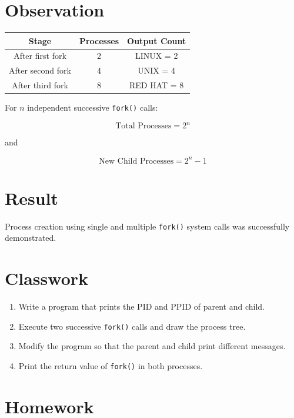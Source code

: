 \documentclass[12pt,a4paper]{report}
\begin{document}
\section*{Observation}

\begin{center}
\begin{tabular}{|c|c|c|}
\hline
\textbf{Stage} &
\textbf{Processes} &
\textbf{Output Count} \\
\hline
After first fork & 2 & LINUX = 2 \\
\hline
After second fork & 4 & UNIX = 4 \\
\hline
After third fork & 8 & RED HAT = 8 \\
\hline
\end{tabular}
\end{center}

For $n$ independent successive \texttt{fork()} calls:

\[
\boxed{\text{Total Processes}=2^n}
\]

and

\[
\boxed{\text{New Child Processes}=2^n-1}
\]

\section*{Result}

Process creation using single and multiple \texttt{fork()} system calls was
successfully demonstrated.

\section*{Classwork}

\begin{enumerate}
    \item Write a program that prints the PID and PPID of parent and child.
    \item Execute two successive \texttt{fork()} calls and draw the process tree.
    \item Modify the program so that the parent and child print different
    messages.
    \item Print the return value of \texttt{fork()} in both processes.
\end{enumerate}

\section*{Homework}
\end{document}
